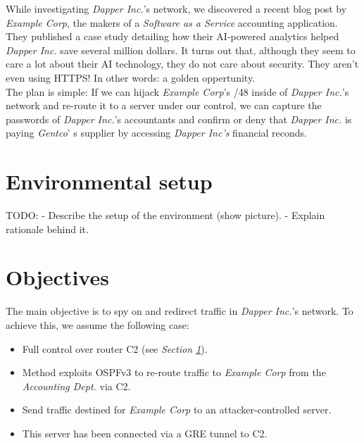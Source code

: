 \documentclass[11pt,a4paper,oneside]{article}
\newcommand{\lsection}[2]{\section{#1}\label{sec:#2}}
\begin{document}
    While investigating \textit{Dapper Inc.}'s network, we discovered a recent blog post by \textit{Example Corp}, the makers of a \textit{Software as a Service} accounting application. They published a case study detailing how their AI-powered analytics helped \textit{Dapper Inc.} save several million dollars. It turns out that, although they seem to care a lot about their AI technology, they do not care about security. They aren't even using HTTPS! In other words: a golden oppertunity.\\
    The plan is simple: If we can hijack \textit{Example Corp}'s /48 inside of \textit{Dapper Inc.}'s network and re-route it to a server under our control, we can capture the passwords of \textit{Dapper Inc.}'s accountants and confirm or deny that \textit{Dapper Inc.} is paying \textit{Gentco}' s supplier by accessing \textit{Dapper Inc's} financial reconds.


    \lsection{Environmental setup}{env_setup}
    TODO:
    - Describe the setup of the environment (show picture).
    - Explain rationale behind it.


    \lsection{Objectives}{objectives}
    The main objective is to spy on and redirect traffic in \textit{Dapper Inc.}'s network. To achieve this, we assume the following case:
    \begin{itemize}
        \item Full control over router C2 (see \textit{Section \ref{sec:env_setup}}).
        \item Method exploits OSPFv3 to re-route traffic to \textit{Example Corp} from the \textit{Accounting Dept.} via C2.
        \item Send traffic destined for \textit{Example Corp} to an attacker-controlled server.
        \item This server has been connected via a GRE tunnel to C2.
    \end{itemize}
\end{document}

